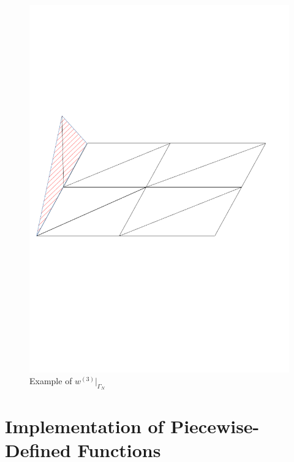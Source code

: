 \documentclass[a4paper]{report}
\begin{document}
\begin{figure}[H]
\begin{center}
\includegraphics[scale=0.30]{li.png}\caption{Example of  $w^{(3)}|_{\Gamma_N}$ }
\end{center}
\end{figure}
\section{Implementation of Piecewise-Defined Functions}
\end{document}
